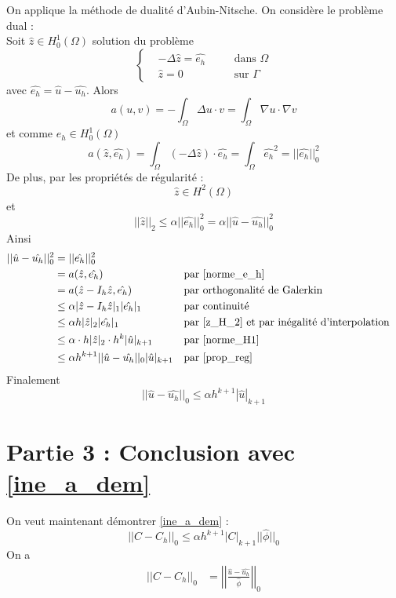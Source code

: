 \documentclass[french]{article}
\begin{document}
	On applique la méthode de dualité d'Aubin-Nitsche. On considère le problème dual : \\
	Soit $\hat{z}\in H_0^1(\Omega)$ solution du problème
	$$\left\{\begin{aligned}
		&-\Delta\hat{z}=\hat{e_h} \quad &&\text{dans }\Omega \\
		&\hat{z}=0 \quad &&\text{sur } \Gamma
	\end{aligned}\right.$$
	avec $\hat{e_h}=\hat{u}-\hat{u_h}$.
	Alors
	$$a(u,v)=-\int_\Omega\Delta u\cdot v=\int_\Omega\nabla u\cdot\nabla v$$
	et comme $e_h\in H_0^1(\Omega)$
	\begin{equation}
		a(\hat{z},\hat{e_h})=\int_\Omega(-\Delta \hat{z})\cdot \hat{e_h}=\int_\Omega \hat{e_h}^2=||\hat{e_h}||_0^2
		\label{norme_e_h}
	\end{equation}
	De plus, par les propriétés de régularité : 
	\begin{equation}
		\hat{z}\in H^2(\Omega)
		\label{z_H_2}
	\end{equation}
	et
	\begin{equation}
		||\hat{z}||_2\le \alpha||\hat{e_h}||_0^2 =\alpha||\hat{u}-\hat{u_h}||_0^2
		\label{prop_reg}
	\end{equation}
	Ainsi
	\begin{align*}
		||\hat{u}-\hat{u_h}||_0^2&=||\hat{e_h}||_0^2 \\
		&=a(\hat{z},\hat{e_h}) &&\text{par \ref{norme_e_h}} \\
		&=a(\hat{z}-I_h\hat{z},\hat{e_h}) &&\text{par orthogonalité de Galerkin} \\
		&\le\alpha|\hat{z}-I_h\hat{z}|_1|\hat{e_h}|_1 &&\text{par continuité} \\
		&\le\alpha h|\hat{z}|_2|\hat{e_h}|_1 &&\text{par \ref{z_H_2} et par inégalité d'interpolation} \\
		&\le\alpha \cdot h|\hat{z}|_2 \cdot h^k|\hat{u}|_{k+1} &&\text{par \ref{norme_H1}} \\
		&\le\alpha h^{k+1}||\hat{u}-\hat{u_h}||_0|\hat{u}|_{k+1} &&\text{par \ref{prop_reg}}
	\end{align*}
	Finalement
	\begin{equation}
		\boxed{||\hat{u}-\hat{u_h}||_0\le\alpha h^{k+1}|\hat{u}|_{k+1}}
	\end{equation}

	\section{Partie 3 : Conclusion avec \ref{ine_a_dem}}
	
	On veut maintenant démontrer \ref{ine_a_dem} :
	$$||C-C_h||_0\le \alpha h^{k+1}|C|_{k+1}||\hat{\phi}||_0$$
	On a 
	\begin{align*}
		||C-C_h||_0&=\left|\left|\frac{\hat{u}-\hat{u_h}}{\hat{\phi}}\right|\right|_0
	\end{align*}

	\color{red}{Comment continuer ??}\color{black}
\end{document}
